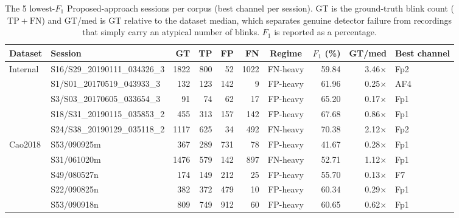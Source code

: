 \begin{table}[ht]
  \centering
  \scriptsize
  \setlength{\tabcolsep}{4pt}
  \caption{The 5 lowest-$F_1$ Proposed-approach sessions per corpus (best channel per session). GT is the ground-truth blink count ($\mathrm{TP}+\mathrm{FN}$) and GT/med is GT relative to the dataset median, which separates genuine detector failure from recordings that simply carry an atypical number of blinks. $F_1$ is reported as a percentage.}
  \label{tab:failure_analysis}
  \begin{tabular}{llrrrrcrrl}
    \toprule
    Dataset & Session & GT & TP & FP & FN & Regime & $F_1$ (\%) & GT/med & Best channel \\
    \midrule
    Internal & S16/S29\_20190111\_034326\_3 & 1822 & 800 & 52 & 1022 & FN-heavy & 59.84 & 3.46$\times$ & Fp2 \\
     & S1/S01\_20170519\_043933\_3 & 132 & 123 & 142 & 9 & FP-heavy & 61.96 & 0.25$\times$ & AF4 \\
     & S3/S03\_20170605\_033654\_3 & 91 & 74 & 62 & 17 & FP-heavy & 65.20 & 0.17$\times$ & Fp1 \\
     & S18/S31\_20190115\_035853\_2 & 455 & 313 & 157 & 142 & FP-heavy & 67.68 & 0.86$\times$ & Fp1 \\
     & S24/S38\_20190129\_035118\_2 & 1117 & 625 & 34 & 492 & FN-heavy & 70.38 & 2.12$\times$ & Fp2 \\
    \midrule
    Cao2018 & S53/090925m & 367 & 289 & 731 & 78 & FP-heavy & 41.67 & 0.28$\times$ & Fp1 \\
     & S31/061020m & 1476 & 579 & 142 & 897 & FN-heavy & 52.71 & 1.12$\times$ & Fp1 \\
     & S49/080527n & 174 & 149 & 212 & 25 & FP-heavy & 55.70 & 0.13$\times$ & F7 \\
     & S22/090825n & 382 & 372 & 479 & 10 & FP-heavy & 60.34 & 0.29$\times$ & Fp1 \\
     & S53/090918n & 809 & 749 & 912 & 60 & FP-heavy & 60.65 & 0.62$\times$ & Fp1 \\
    \bottomrule
  \end{tabular}
\end{table}
